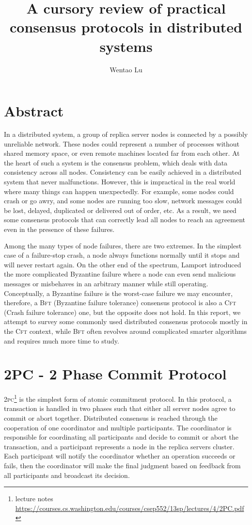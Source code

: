 \documentclass[11pt]{article}
\title{A cursory review of practical consensus protocols in distributed systems}
\author{Wentao Lu}
\date{}
\begin{document}
  \maketitle

  \section{Abstract}
    In a distributed system, a group of replica server nodes is connected by a possibly unreliable network. These nodes could represent a number of processes without shared memory space, or even remote machines located far from each other. At the heart of such a system is the consensus problem, which deals with data consistency across all nodes. Consistency can be easily achieved in a distributed system that never malfunctions. However, this is impractical in the real world where many things can happen unexpectedly. For example, some nodes could crash or go awry, and some nodes are running too slow, network messages could be lost, delayed, duplicated or delivered out of order, etc. As a result, we need some consensus protocols that can correctly lead all nodes to reach an agreement even in the presence of these failures.

    Among the many types of node failures, there are two extremes. In the simplest case of a failure-stop crash, a node always functions normally until it stops and will never restart again. On the other end of the spectrum, Lamport introduced the more complicated Byzantine failure where a node can even send malicious messages or misbehaves in an arbitrary manner while still operating. Conceptually, a Byzantine failure is the worst-case failure we may encounter, therefore, a \textsc{Bft} (Byzantine failure tolerance) consensus protocol is also a \textsc{Cft} (Crash failure tolerance) one, but the opposite does not hold. In this report, we attempt to survey some commonly used distributed consensus protocols mostly in the \textsc{Cft} context, while \textsc{Bft} often revolves around complicated smarter algorithms and requires much more time to study.

  \section{2PC - 2 Phase Commit Protocol}
    \textsc{2pc}\footnote{\label{}lecture notes \url{https://courses.cs.washington.edu/courses/csep552/13sp/lectures/4/2PC.pdf}} is the simplest form of atomic commitment protocol. In this protocol, a transaction is handled in two phases such that either all server nodes agree to commit or abort together. Distributed consensus is reached through the cooperation of one coordinator and multiple participants. The coordinator is responsible for coordinating all participants and decide to commit or abort the transaction, and a participant represents a node in the replica servers cluster. Each participant will notify the coordinator whether an operation succeeds or fails, then the coordinator will make the final judgment based on feedback from all participants and broadcast its decision.\\
\end{document}
